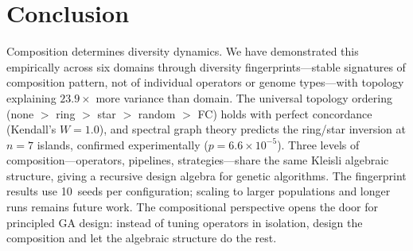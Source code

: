 \documentclass[dvipsnames,format=sigconf,anonymous=true,review=true]{acmart}
\begin{document}
\section{Conclusion}

Composition determines diversity dynamics. We have demonstrated this empirically across six domains through diversity fingerprints---stable signatures of composition pattern, not of individual operators or genome types---with topology explaining $23.9\times$ more variance than domain. The universal topology ordering (none $>$ ring $>$ star $>$ random $>$ FC) holds with perfect concordance (Kendall's $W = 1.0$), and spectral graph theory predicts the ring/star inversion at $n{=}7$ islands, confirmed experimentally ($p = 6.6 \times 10^{-5}$). Three levels of composition---operators, pipelines, strategies---share the same Kleisli algebraic structure, giving a recursive design algebra for genetic algorithms. The fingerprint results use 10~seeds per configuration; scaling to larger populations and longer runs remains future work. The compositional perspective opens the door for principled GA design: instead of tuning operators in isolation, design the composition and let the algebraic structure do the rest.



\end{document}
